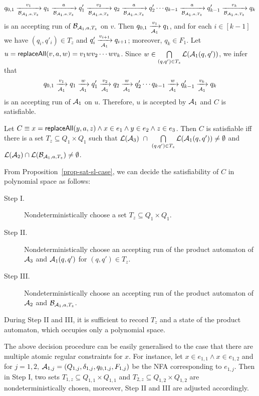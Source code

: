 $$
q_{0,1} \xrightarrow[\mathcal{B}_{\mathcal{A}_1,a,T_z}]{v_1} q_1 \xrightarrow[\mathcal{B}_{\mathcal{A}_1,a,T_z}]{a} q'_1 \xrightarrow[\mathcal{B}_{\mathcal{A}_1,a,T_z}]{v_2} q_2 \xrightarrow[\mathcal{B}_{\mathcal{A}_1,a,T_z}]{a} q'_2 \cdots q_{k-1} \xrightarrow[\mathcal{B}_{\mathcal{A}_1,a,T_z}]{a} q'_{k-1} \xrightarrow[\mathcal{B}_{\mathcal{A}_1,a,T_z}]{v_k} q_k
$$
is an accepting run of $\mathcal{B}_{\mathcal{A}_1,a,T_z}$ on $v$. Then $q_{0,1} \xrightarrow[\mathcal{A}_1]{v_1} q_1$, and for each $i \in [k-1]$ we have $(q_i, q'_i) \in T_z$ and $q'_i \xrightarrow[\mathcal{A}_1]{v_{i+1}} q_{i+1}$; moreover, $q_k \in F_1$.
Let $u = \mathsf{replaceAll}(v, a, w)=v_1 w v_2 \cdots w v_k$. Since $w \in \bigcap \limits_{(q, q') \in T_z} \mathcal{L}(\mathcal{A}_1(q, q'))$,  we infer that
$$
q_{0,1} \xrightarrow[\mathcal{A}_1]{v_1} q_1 \xrightarrow[\mathcal{A}_1]{w} q'_1 \xrightarrow[\mathcal{A}_1]{v_2} q_2 \xrightarrow[\mathcal{A}_1]{w} q'_2 \cdots q_{k-1} \xrightarrow[\mathcal{A}_1]{w} q'_{k-1} \xrightarrow[\mathcal{A}_1]{v_k} q_k
$$
is an accepting run of $\mathcal{A}_1$ on $u$. Therefore, $u$ is accepted by $\mathcal{A}_1$ and $C$ is satisfiable.

\begin{proposition}\label{prop-sat-sl-case}
Let $C \equiv x = \mathsf{replaceAll}(y, a, z) \wedge x \in e_1 \wedge y \in e_2 \wedge z \in e_3$. Then $C$ is satisfiable iff there is a set $T_{z} \subseteq Q_1 \times Q_1$ such that $\mathcal{L}(\mathcal{A}_3)\ \cap\ \bigcap \limits_{(q, q') \in T_z} \mathcal{L}(\mathcal{A}_1(q, q')) \neq \emptyset$ and $ \mathcal{L}(\mathcal{A}_2) \cap \mathcal{L}(\mathcal{B}_{\mathcal{A}_1,a,T_z}) \neq \emptyset$.
\end{proposition}

From Proposition~\ref{prop-sat-sl-case}, we can decide the satisfiability of $C$ in polynomial space as follows:
\begin{description}
\item[Step I.] Nondeterministically choose a set $T_{z} \subseteq Q_1 \times Q_1$.
%
\item[Step II.] Nondeterministically choose an accepting run of the product automaton of $\mathcal{A}_3$ and $\mathcal{A}_1(q, q')$ for $(q,q') \in T_{z}$.
%
\item[Step III.] Nondeterministically choose an accepting run of the product automaton of $\mathcal{A}_2$ and $\mathcal{B}_{\mathcal{A}_1, a,  T_{z}}$.
\end{description}
During Step II and III, it is sufficient to record $T_z$ and a state of the product automaton, which occupies only a polynomial space.

The above decision procedure can be easily generalised to the case that there are multiple atomic regular constraints for $x$. For instance, let $x \in e_{1,1} \wedge x \in e_{1,2}$ and for $j = 1, 2$, $\mathcal{A}_{1,j} = (Q_{1,j}, \delta_{1, j}, q_{0,1, j}, F_{1,j})$ be
the NFA corresponding to $e_{1,j}$. Then in Step I, two sets $T_{1,z} \subseteq Q_{1,1} \times Q_{1,1}$ and $T_{2,z} \subseteq Q_{1,2} \times Q_{1,2}$ are nondeterministically chosen, moreover, Step II and III are adjusted accordingly.

